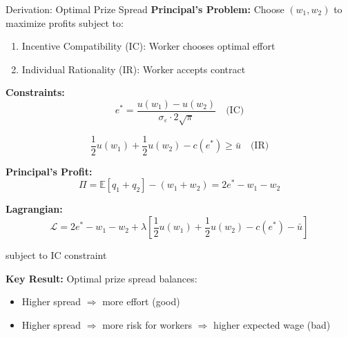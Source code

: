 \documentclass[xcolor={x11names}]{beamer}
\begin{document}
\begin{frame}{Derivation: Optimal Prize Spread}
\textbf{Principal's Problem:} Choose $(w_1, w_2)$ to maximize profits subject to:
\begin{enumerate}
  \item Incentive Compatibility (IC): Worker chooses optimal effort
  \item Individual Rationality (IR): Worker accepts contract
\end{enumerate}

\textbf{Constraints:}
$$e^* = \frac{u(w_1) - u(w_2)}{\sigma_\varepsilon \cdot 2\sqrt{\pi}} \quad \text{(IC)}$$

$$\frac{1}{2}u(w_1) + \frac{1}{2}u(w_2) - c(e^*) \geq \bar{u} \quad \text{(IR)}$$

\textbf{Principal's Profit:}
$$\Pi = \mathbb{E}[q_1 + q_2] - (w_1 + w_2) = 2e^* - w_1 - w_2$$

\textbf{Lagrangian:}
$$\mathcal{L} = 2e^* - w_1 - w_2 + \lambda\left[\frac{1}{2}u(w_1) + \frac{1}{2}u(w_2) - c(e^*) - \bar{u}\right]$$

subject to IC constraint

\textbf{Key Result:} Optimal prize spread balances:
\begin{itemize}
  \item Higher spread $\Rightarrow$ more effort (good)
  \item Higher spread $\Rightarrow$ more risk for workers $\Rightarrow$ higher expected wage (bad)
\end{itemize}
\end{frame}
\end{document}
